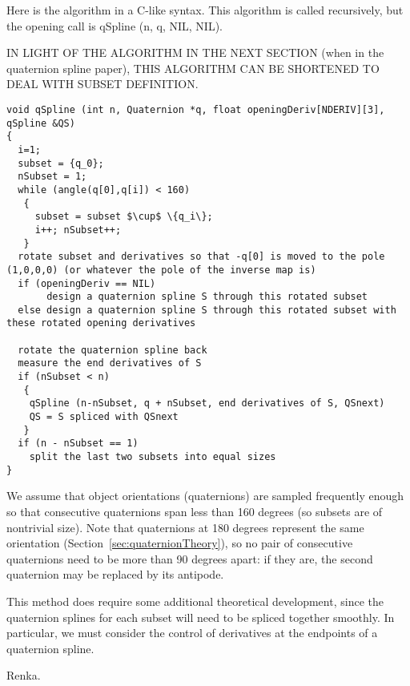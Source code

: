 \documentclass[12pt]{article}
\begin{document}
Here is the algorithm in a C-like syntax.
This algorithm is called recursively, but the opening call is qSpline (n, q, NIL, NIL).

IN LIGHT OF THE ALGORITHM IN THE NEXT SECTION (when in the quaternion spline paper), 
THIS ALGORITHM CAN BE SHORTENED TO DEAL WITH SUBSET DEFINITION.

\begin{verbatim}
void qSpline (int n, Quaternion *q, float openingDeriv[NDERIV][3], qSpline &QS)
{
  i=1;
  subset = {q_0};
  nSubset = 1;
  while (angle(q[0],q[i]) < 160)
   {
     subset = subset $\cup$ \{q_i\};
     i++; nSubset++;
   }
  rotate subset and derivatives so that -q[0] is moved to the pole (1,0,0,0) (or whatever the pole of the inverse map is)
  if (openingDeriv == NIL)
       design a quaternion spline S through this rotated subset
  else design a quaternion spline S through this rotated subset with these rotated opening derivatives
  
  rotate the quaternion spline back
  measure the end derivatives of S
  if (nSubset < n)
   {
    qSpline (n-nSubset, q + nSubset, end derivatives of S, QSnext)
    QS = S spliced with QSnext
   }
  if (n - nSubset == 1)
    split the last two subsets into equal sizes
}
\end{verbatim}

We assume that object orientations (quaternions) are sampled frequently enough
so that consecutive quaternions span less than 160 degrees
(so subsets are of nontrivial size).
Note that quaternions at 180 degrees represent the same orientation (Section~\ref{sec:quaternionTheory}),
so no pair of consecutive quaternions need to be more than 90 degrees apart:
if they are, the second quaternion may be replaced by its antipode.

This method does require some additional theoretical development,
since the quaternion splines for each subset will need to be spliced 
together smoothly.
In particular, we must consider the control of derivatives at the endpoints of a
quaternion spline.


\begin{thebibliography}{99}

Renka.

\end{thebibliography}
\end{document}

